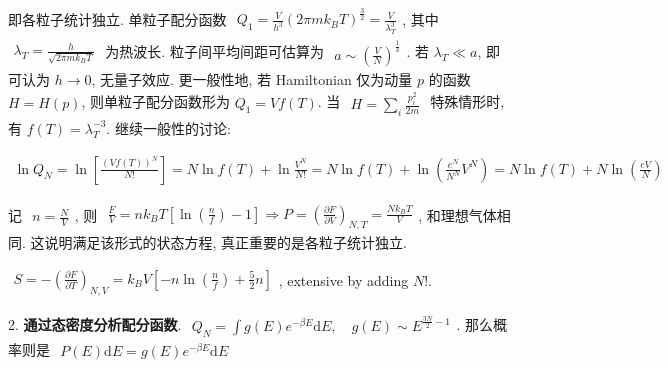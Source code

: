 \documentclass[../../main.tex]{subfiles}
\begin{document}
即各粒子统计独立. 单粒子配分函数 $\begin{aligned}
    Q_{1} = \frac{V}{h^{3}}(2\pi mk_{B}T)^{\frac{3}{2}} = \frac{V}{\lambda_{T}^{3}}
\end{aligned}$, 其中 $\begin{aligned}
    \lambda_{T} = \frac{h}{\sqrt{2\pi mk_{B}T}}
\end{aligned}$ 为热波长. 粒子间平均间距可估算为 $\begin{aligned}
    a\sim \left(\frac{V}{N}\right)^{\frac{1}{3}}
\end{aligned}$. 若 $\lambda_{T}\ll a$, 即可认为 $h\rightarrow 0$, 无量子效应. 更一般性地, 若 Hamiltonian 仅为动量 $p$ 的函数 $H = H(p)$, 则单粒子配分函数形为 $Q_{1} = Vf(T)$. 当 $\begin{aligned}
    H = \sum_{i}\frac{p_{i}^{2}}{2m}
\end{aligned}$ 特殊情形时, 有 $f(T) = \lambda_{T}^{-3}$. 继续一般性的讨论: 

$\begin{aligned}
    \ln{Q_{N}} = \ln{\left[\frac{(Vf(T))^{N}}{N!}\right]} = N\ln{f(T)} + \ln{\frac{V^{N}}{N!}} = N\ln{f(T)} + \ln{\left(\frac{e^{N}}{N^{N}}V^{N}\right)} = N\ln{f(T)} + N\ln{\left(\frac{eV}{N}\right)}
\end{aligned}$

记 $\begin{aligned}
    n = \frac{N}{V}
\end{aligned}$, 则 $\begin{aligned}
    \frac{F}{V} = nk_{B}T\left[\ln{\left(\frac{n}{f}\right)}-1\right]\Rightarrow P = \left(\frac{\partial F}{\partial V}\right)_{N,T} = \frac{Nk_{B}T}{V}
\end{aligned}$, 和理想气体相同. 这说明满足该形式的状态方程, 真正重要的是各粒子统计独立. 

$\begin{aligned}
    S = -\left(\frac{\partial F}{\partial T}\right)_{N,V} = k_{B}V\left[-n\ln{\left(\frac{n}{f}\right)} + \frac{5}{2}n\right]
\end{aligned}$, extensive by adding $N!$.

2. \textbf{通过态密度分析配分函数}. $\begin{aligned}
    Q_{N} = \int g(E)e^{-\beta E}\mathrm{d}E,\quad g(E)\sim E^{\frac{3N}{2}-1}
\end{aligned}$. 那么概率则是 $\begin{aligned}
    P(E)\mathrm{d}E = g(E)e^{-\beta E}\mathrm{d}E
\end{aligned}$
\end{document}
